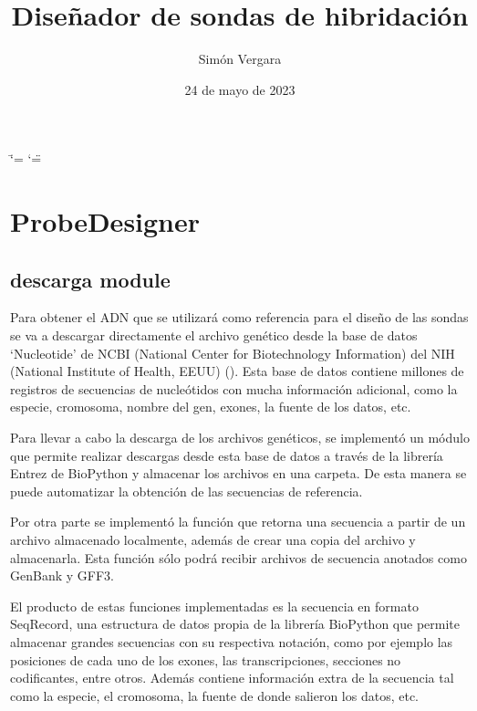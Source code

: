 \documentclass[letterpaper,10pt,spanish]{sphinxmanual}
\title{Diseñador de sondas de hibridación}
\date{24 de mayo de 2023}
\author{Simón Vergara}
\begin{document}
\ifdefined\shorthandoff
  \ifnum\catcode`\=\string=\active\shorthandoff{=}\fi
  \ifnum\catcode`\"=\active{}\fi
\fi

\pagestyle{empty}
\sphinxmaketitle
\pagestyle{plain}
\sphinxtableofcontents
\pagestyle{normal}
\label{\detokenize{index::doc}}


\sphinxstepscope


\chapter{Probe\sphinxhyphen{}Designer}
\label{\detokenize{modules:probe-designer}}\label{\detokenize{modules::doc}}
\sphinxstepscope


\section{descarga module}
\label{\detokenize{descarga:descarga-module}}\label{\detokenize{descarga::doc}}
\sphinxAtStartPar
Para obtener el ADN que se utilizará como referencia para el diseño de las sondas se va a descargar directamente el archivo genético desde la base de datos ‘Nucleotide’ de NCBI (National Center for Biotechnology Information) del NIH (National Institute of Health, EEUU) (). Esta base de datos contiene millones de registros de secuencias de nucleótidos con mucha información adicional, como la especie, cromosoma, nombre del gen, exones, la fuente de los datos, etc.

\sphinxAtStartPar
Para llevar a cabo la descarga de los archivos genéticos, se implementó un módulo que permite realizar descargas desde esta base de datos a través de la librería Entrez de BioPython y almacenar los archivos en una carpeta. De esta manera se puede automatizar la obtención de las secuencias de referencia.

\sphinxAtStartPar
Por otra parte se implementó la función que retorna una secuencia a partir de un archivo almacenado localmente, además de crear una copia del archivo y almacenarla. Esta función sólo podrá recibir archivos de secuencia anotados como GenBank y GFF3.

\sphinxAtStartPar
El producto de estas funciones implementadas es la secuencia en formato SeqRecord, una estructura de datos propia de la librería BioPython que permite almacenar grandes secuencias con su respectiva notación, como por ejemplo las posiciones de cada uno de los exones, las transcripciones, secciones no codificantes, entre otros. Además contiene información extra de la secuencia tal como la especie, el cromosoma, la fuente de donde salieron los datos, etc.
\end{document}

